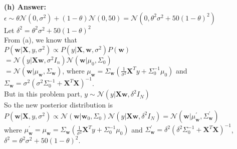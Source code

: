 \documentclass{article}
\begin{document}
\newpage
\noindent
\textbf{(h) Answer:}\\
$\epsilon \sim \theta\mathcal{N}(0, \sigma^2) +(1 - \theta)\mathcal{N}(0, 50) = \mathcal{N}(0, \theta^2\sigma^2 + 50(1-\theta)^2)$\\
Let $\delta^2 = \theta^2\sigma^2 + 50(1-\theta)^2$\\
From (a), we know that \\
$P(\textbf{w}|\textbf{X}, y, \sigma^2) \propto P(y|\textbf{X}, \textbf{w}, \sigma^2)P(\textbf{w})$\\  
$=\mathcal{N}(y|\textbf{X}\textbf{w}, \sigma^2I_n)\mathcal{N}(\textbf{w}|\mu_0, \Sigma_0)$\\
$= \mathcal{N}(\textbf{w}|\mu_\textbf{w}, \Sigma_\textbf{w})$,
where  $\mu_\textbf{w} = \Sigma_\textbf{w}(\frac{1}{\sigma^2}\textbf{X}^Ty + \Sigma_0^{-1}\mu_0)$ and $\Sigma_\textbf{w} = \sigma^2 (\sigma^2 \Sigma_0^{-1} + \textbf{X}^T\textbf{X})^{-1}$.\\
But in this problem part, $y \sim \mathcal{N}(y|\textbf{X}\textbf{w}, \delta^2I_N)$\\
So the new posterior distribution is\\
$P(\textbf{w}|\textbf{X}, y, \sigma^2) \propto \mathcal{N}(\textbf{w}|\textbf{w}_0, \Sigma_0)\mathcal{N}(y|\textbf{X}\textbf{w}, \delta^2I_N) = \mathcal{N}(\textbf{w}|\mu_\textbf{w}^{'}, \Sigma_\textbf{w}^{'})$\\
where $\mu_\textbf{w}^{'} = \mu_\textbf{w} = \Sigma_\textbf{w}(\frac{1}{\sigma^2}\textbf{X}^Ty + \Sigma_0^{-1}\mu_0)$ and $\Sigma_\textbf{w}^{'} = \delta^2(\delta^2 \Sigma_0^{-1} + \textbf{X}^T\textbf{X})^{-1}$, $\delta^2 = \theta^2\sigma^2 + 50(1-\theta)^2$.
\end{document}
